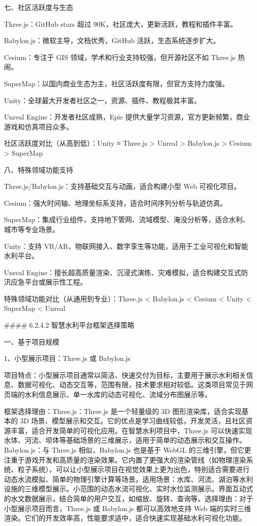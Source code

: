 七、社区活跃度与生态

Three.js：GitHub stars 超过 90K，社区庞大，更新活跃，教程和插件丰富。

Babylon.js：微软主导，文档优秀，GitHub 活跃，生态系统逐步扩大。

Cesium：专注于 GIS 领域，学术和行业支持较强，但开源社区不如 Three.js 热闹。

SuperMap：以国内商业生态为主，社区活跃度有限，但官方支持力度强。

Unity：全球最大开发者社区之一，资源、插件、教程极其丰富。

Unreal Engine：开发者社区成熟，Epic 提供大量学习资源，官方更新频繁，商业游戏和仿真项目众多。

社区活跃度对比（从高到低）：Unity ≈ Three.js \textgreater{} Unreal \textgreater{} Babylon.js \textgreater{} Cesium \textgreater{} SuperMap

八、特殊领域功能支持

Three.js/Babylon.js：支持基础交互与动画，适合构建小型 Web 可视化项目。

Cesium：强大时间轴、地理坐标系支持，适合时间序列分析与轨迹仿真。

SuperMap：集成行业组件，支持地下管网、流域模型、淹没分析等，适合水利、城市等专业场景。

Unity：支持 VR/AR、物联网接入、数字孪生等功能，适用于工业可视化和智能水利平台。

Unreal Engine：擅长超高质量渲染、沉浸式演练、灾难模拟，适合构建交互式防汛应急平台或展示性工程。

特殊领域功能对比（从通用到专业）：Three.js \textless{} Babylon.js \textless{} Cesium \textless{} Unity \textless{} SuperMap \textless{} Unreal

\#\#\#\# 6.2.4.2 智慧水利平台框架选择策略

一、基于项目规模

1、小型展示项目：Three.js 或 Babylon.js

项目特点：小型展示项目通常以简洁、快速交付为目标，主要用于展示水利相关信息、数据可视化、动态交互等，范围有限，技术要求相对较低。这类项目常见于网页端的水利信息展示、单一水库的动态可视化、流域分布图展示等。

框架选择理由：Three.js：Three.js 是一个轻量级的 3D 图形渲染库，适合实现基本的 3D 场景、模型展示和交互。它的优点是学习曲线较低，开发灵活，且社区资源丰富，适合开发简单的可视化应用。在智慧水利项目中，Three.js 可以快速实现水体、河流、坝体等基础场景的三维展示，适用于简单的动态展示和交互操作。Babylon.js：与 Three.js 相似，Babylon.js 也是基于 WebGL 的三维引擎，但它更注重于游戏开发和高质量的渲染效果。它内置了更强大的渲染管线（如物理渲染系统、粒子系统），可以让小型展示项目在视觉效果上更为出色，特别适合需要进行动态水流模拟、简单的物理引擎计算等场景。适用场景：水库、河流、湖泊等水利设施的三维模型展示。小范围的动态水流可视化、实时水位监测展示。界面互动式的水文数据展示，结合简单的用户交互，如缩放、旋转、查询等。选择理由：对于小型展示项目而言，Three.js 或 Babylon.js 都可以高效地支持 Web 端的实时三维渲染。它们的开发效率高，性能要求适中，适合快速实现基础水利可视化功能。

